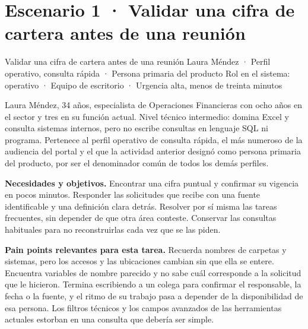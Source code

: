 \clearpage
{}

\section{Escenario 1 · Validar una cifra de cartera antes de una reunión}\label{sec:escenarios}

  {Validar una cifra de cartera antes de una reunión}
  {Laura Méndez · Perfil operativo, consulta rápida · Persona primaria del producto}
  {Rol en el sistema: operativo · Equipo de escritorio · Urgencia alta, menos de treinta minutos}


Laura Méndez, 34 años, especialista de Operaciones Financieras con ocho años en el sector y
tres en su función actual. Nivel técnico intermedio: domina Excel y consulta sistemas
internos, pero no escribe consultas en lenguaje SQL ni programa. Pertenece al perfil
operativo de consulta rápida, el más numeroso de la audiencia del portal y el que la
actividad anterior designó como persona primaria del producto, por ser el denominador común
de todos los demás perfiles.

\textbf{\textcolor{uxnavy}{Necesidades y objetivos.}} Encontrar una cifra puntual y confirmar
su vigencia en pocos minutos. Responder las solicitudes que recibe con una fuente
identificable y una definición clara detrás. Resolver por sí misma las tareas frecuentes, sin
depender de que otra área conteste. Conservar las consultas habituales para no reconstruirlas
cada vez que se las piden.

\textbf{\textcolor{uxnavy}{Pain points relevantes para esta tarea.}} Recuerda nombres de
carpetas y sistemas, pero los accesos y las ubicaciones cambian sin que ella se entere.
Encuentra variables de nombre parecido y no sabe cuál corresponde a la solicitud que le
hicieron. Termina escribiendo a un colega para confirmar el responsable, la fecha o la fuente,
y el ritmo de su trabajo pasa a depender de la disponibilidad de esa persona. Los filtros
técnicos y los campos avanzados de las herramientas actuales estorban en una consulta que
debería ser simple.

